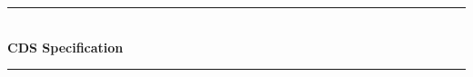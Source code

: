 \begin{titlepage}

\newcommand{\HRule}{\rule{\linewidth}{0.5mm}} %

\center %

\HRule \\[0.1cm]
{ \huge \bfseries CDS Specification}\\[0.4cm] %
\HRule \\[1cm]

\vspace*{-\fill} %
\end{titlepage}